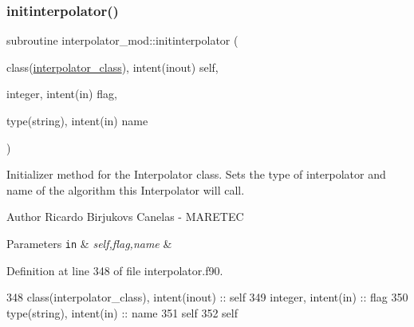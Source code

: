 \subsubsection{\texorpdfstring{initinterpolator()}{initinterpolator()}}
{\footnotesize\ttfamily subroutine interpolator\+\_\+mod\+::initinterpolator (\begin{DoxyParamCaption}\item[{class(\mbox{\hyperlink{structinterpolator__mod_1_1interpolator__class}{interpolator\+\_\+class}}), intent(inout)}]{self,  }\item[{integer, intent(in)}]{flag,  }\item[{type(string), intent(in)}]{name }\end{DoxyParamCaption})\hspace{0.3cm}{\ttfamily [private]}}



Initializer method for the Interpolator class. Sets the type of interpolator and name of the algorithm this Interpolator will call. 

\begin{DoxyAuthor}{Author}
Ricardo Birjukovs Canelas -\/ M\+A\+R\+E\+T\+EC 
\end{DoxyAuthor}

\begin{DoxyParams}[1]{Parameters}
\mbox{\tt in}  & {\em self,flag,name} & \\
\hline
\end{DoxyParams}


Definition at line 348 of file interpolator.\+f90.


\begin{DoxyCode}
348     \textcolor{keywordtype}{class}(interpolator\_class), \textcolor{keywordtype}{intent(inout)} :: self
349     \textcolor{keywordtype}{integer}, \textcolor{keywordtype}{intent(in)} :: flag
350     \textcolor{keywordtype}{type}(string), \textcolor{keywordtype}{intent(in)} :: name
351     self%
352     self%
\end{DoxyCode}
\mbox{\label{namespaceinterpolator__mod_adcd5e67fbafc57180f69bfafa64377dc}} 
